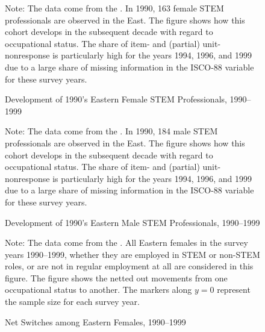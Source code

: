 \documentclass[a4paper, oneside, hyperfootnotes = false]{article}
\begin{document}
{\begin{figure}[ht]
	\centering
	\caption{Development of 1990's Eastern Female STEM Professionals, 1990--1999}
	\label{fig:survivalfemale}
	\fontsize{9pt}{11pt}\selectfont
	\def\svgwidth{\textwidth}
	
	\vspace{2mm}
	\parbox{10cm}{
	\linespread{1}\footnotesize Note: The data come from the \cite{SOEP2023}. In 1990, 163 female STEM professionals are observed in the East. The figure shows how this cohort develops in the subsequent decade with regard to occupational status. The share of item- and (partial) unit-nonresponse is particularly high for the years 1994, 1996, and 1999 due to a large share of missing information in the ISCO-88 variable for these survey years.}
\end{figure}

\begin{figure}[ht]
	\centering
	\caption{Development of 1990's Eastern Male STEM Professionals, 1990--1999}
	\label{fig:survivalmale}
	\fontsize{9pt}{11pt}\selectfont
	\def\svgwidth{\textwidth}
	
	\vspace{2mm}
	\parbox{10cm}{
	\linespread{1}\footnotesize Note: The data come from the \cite{SOEP2023}. In 1990, 184 male STEM professionals are observed in the East. The figure shows how this cohort develops in the subsequent decade with regard to occupational status. The share of item- and (partial) unit-nonresponse is particularly high for the years 1994, 1996, and 1999 due to a large share of missing information in the ISCO-88 variable for these survey years.}
\end{figure}

\begin{figure}[ht]
	\centering
	\caption{Net Switches among Eastern Females, 1990--1999}
	\label{fig:netswitches}
	\fontsize{9pt}{11pt}\selectfont
	\def\svgwidth{\textwidth}
	
	\vspace{2mm}
	\parbox{10cm}{
		\linespread{1}\footnotesize Note: The data come from the \cite{SOEP2023}. All Eastern females in the survey years 1990--1999, whether they are employed in STEM or non-STEM roles, or are not in regular employment at all are considered in this figure. The figure shows the netted out movements from one occupational status to another. The markers along $y = 0$ represent the sample size for each survey year.}
\end{figure}

\clearpage

}
\end{document}
